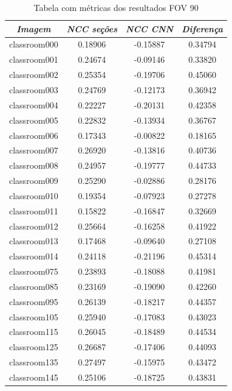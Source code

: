 \documentclass[cic,tc]{iiufrgs}
\begin{document}
\begin{table}[h]
    \caption{Tabela com métricas dos resultados FOV 90\degree}
    \centering
        \begin{tabular}{c|c|c|c}
          \hline
          \textit{Imagem} & \textit{NCC seções} & \textit{NCC CNN} & \textit{Diferença} \\
          \hline
          \hline
          classroom000 & 0.18906 & -0.15887 & 0.34794 \\
          classroom001 & 0.24674 & -0.09146 & 0.33820 \\
          classroom002 & 0.25354 & -0.19706 & 0.45060 \\
          classroom003 & 0.24769 & -0.12173 & 0.36942 \\
          classroom004 & 0.22227 & -0.20131 & 0.42358 \\
          classroom005 & 0.22832 & -0.13934 & 0.36767 \\
          classroom006 & 0.17343 & -0.00822 & 0.18165 \\
          classroom007 & 0.26920 & -0.13816 & 0.40736 \\
          classroom008 & 0.24957 & -0.19777 & 0.44733 \\
          classroom009 & 0.25290 & -0.02886 & 0.28176 \\
          classroom010 & 0.19354 & -0.07923 & 0.27278 \\
          classroom011 & 0.15822 & -0.16847 & 0.32669 \\
          classroom012 & 0.25664 & -0.16258 & 0.41922 \\
          classroom013 & 0.17468 & -0.09640 & 0.27108 \\
          classroom014 & 0.24118 & -0.21196 & 0.45314 \\
          classroom075 & 0.23893 & -0.18088 & 0.41981 \\
          classroom085 & 0.23169 & -0.19090 & 0.42260 \\
          classroom095 & 0.26139 & -0.18217 & 0.44357 \\
          classroom105 & 0.25940 & -0.17083 & 0.43023 \\
          classroom115 & 0.26045 & -0.18489 & 0.44534 \\
          classroom125 & 0.26687 & -0.17406 & 0.44093 \\
          classroom135 & 0.27497 & -0.15975 & 0.43472 \\
          classroom145 & 0.25106 & -0.18725 & 0.43831 \\

\end{tabular}
\end{table}
\end{document}
